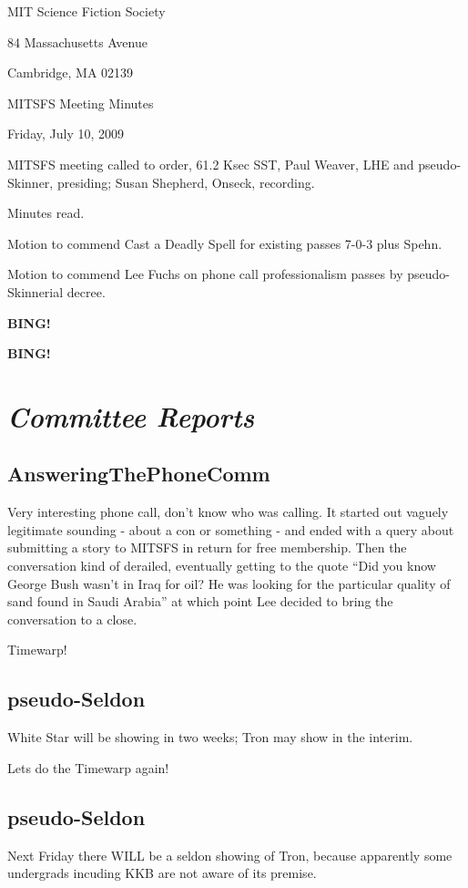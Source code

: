 \documentclass[10pt]{article}
\newcommand{\bing}{{\bf BING!} }
\newcommand{\goto}[1]{\bing \vskip 12pt \section*{{\em{#1}}}}
\newcommand{\ps}{ plus Spehn\xspace}
\begin{document}
\begin{center}

MIT Science Fiction Society

84 Massachusetts Avenue

Cambridge, MA 02139

\vspace{12pt}

MITSFS Meeting Minutes

Friday, July 10, 2009

\end{center}

\vspace{18pt}

\setlength{\parskip}{6pt}

\noindent
MITSFS meeting called to order, 61.2 Ksec SST,
Paul Weaver, LHE and pseudo-Skinner, presiding; Susan Shepherd, Onseck, recording.

Minutes read.

Motion to commend Cast a Deadly Spell for existing passes 7-0-3\ps.

Motion to commend Lee Fuchs on phone call professionalism passes by pseudo-Skinnerial decree.

\bing

\goto{Committee Reports}

\subsection*{AnsweringThePhoneComm}
Very interesting phone call, don't know who was calling. It started out vaguely legitimate sounding - about a con or something - and ended with a query about submitting a story to MITSFS in return for free membership. Then the conversation kind of derailed, eventually getting to the quote ``Did you know George Bush wasn't in Iraq for oil? He was looking for the particular quality of sand found in Saudi Arabia'' at which point Lee decided to bring the conversation to a close.

Timewarp!

\subsection*{pseudo-Seldon}
White Star will be showing in two weeks; Tron may show in the interim.

Lets do the Timewarp again!

\subsection*{pseudo-Seldon}
Next Friday there WILL be a seldon showing of Tron, because apparently some undergrads incuding KKB are not aware of its premise.
\end{document}
